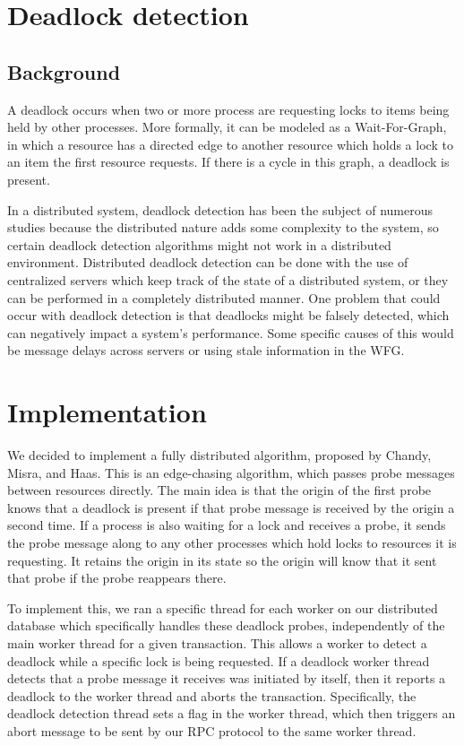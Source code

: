 \documentclass[a4paper, 10pt, notitlepage]{report}
\begin{document}
\section*{Deadlock detection}
\subsection*{Background}
A deadlock occurs when two or more process are requesting locks to items being held by other processes. More formally, it can be modeled as a Wait-For-Graph, in which a resource has a directed edge to another resource which holds a lock to an item the first resource requests. If there is a cycle in this graph, a deadlock is present.

In a distributed system, deadlock detection has been the subject of numerous studies because the distributed nature adds some complexity to the system, so certain deadlock detection algorithms might not work in a distributed environment. Distributed deadlock detection can be done with the use of centralized servers which keep track of the state of a distributed system, or they can be performed in a completely distributed manner. One problem that could occur with deadlock detection is that deadlocks might be falsely detected, which can negatively impact a system's performance. Some specific causes of this would be message delays across servers or using stale information in the WFG.

\section*{Implementation}
We decided to implement a fully distributed algorithm, proposed by Chandy, Misra, and Haas. This is an edge-chasing algorithm, which passes probe messages between resources directly. The main idea is that the origin of the first probe knows that a deadlock is present if that probe message is received by the origin a second time. If a process is also waiting for a lock and receives a probe, it sends the probe message along to any other processes which hold locks to resources it is requesting. It retains the origin in its state so the origin will know that it sent that probe if the probe reappears there.

To implement this, we ran a specific thread for each worker on our distributed database which specifically handles these deadlock probes, independently of the main worker thread for a given transaction. This allows a worker to detect a deadlock while a specific lock is being requested. If a deadlock worker thread detects that a probe message it receives was initiated by itself, then it reports a deadlock to the worker thread and aborts the transaction. Specifically, the deadlock detection thread sets a flag in the worker thread, which then triggers an abort message to be sent by our RPC protocol to the same worker thread.
\end{document}
